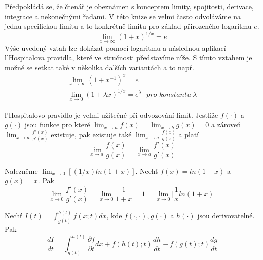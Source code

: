 Předpokládá se, že čtenář je obeznámen s konceptem limity, spojitosti, derivace, integrace a nekonečnými řadami. V této knize se velmi často odvoláváme na jednu specifickou limitu a to konkrétně limitu pro základ přirozeného logaritmu $e$.
\begin{equation*}
\lim_{x \rightarrow \infty}(1 + x)^{1/x} = e
\end{equation*}
Výše uvedený vztah lze dokázat pomocí logaritmu a následnou aplikací l'Hospitalova pravidla, které ve stručnosti představíme níže. S tímto vztahem je možné se setkat také v několika dalších variantách a to např.
\begin{gather*}
\lim_{x \rightarrow \infty}(1 + x^{-1})^x = e\\
\lim_{x \rightarrow 0}(1 + \lambda x)^{1/x} = e^{\lambda} ~~~\textit{pro konstantu}~ \lambda
\end{gather*}

\begin{definition}
l'Hospitalovo pravidlo je velmi užitečné při odvozování limit. Jestliže $f(\cdot)$ a $g(\cdot)$ jsou funkce pro které $\lim_{x \rightarrow a}f(x) = \lim_{x \rightarrow b}g(x) = 0$ a zároveň $\lim_{x \rightarrow a} \frac{f'(x)}{g'(x)}$ existuje, pak existuje také $\lim_{x \rightarrow a} \frac{f(x)}{g(x)}$ a platí
\begin{equation*}
\lim_{x \rightarrow a} \frac{f(x)}{g(x)} = \lim_{x \rightarrow a} \frac{f'(x)}{g'(x)}
\end{equation*}
\end{definition}

\begin{example}
Nalezněme $\lim_{x \rightarrow 0}[(1/x)ln(1 + x)]$.
Nechť $f(x) = ln(1 + x)$ a $g(x) = x$. Pak
\begin{equation*}
\lim_{x \rightarrow 0} \frac{f'(x)}{g'(x)} = \lim_{x \rightarrow 0} \frac{1}{1 + x} = 1 = \lim_{x \rightarrow 0}\Big[\frac{1}{x} ln(1 + x)\Big]
\end{equation*}
\end{example}

\begin{definition}
Nechť $I(t) = \int_{g(t)}^{h(t)}f(x;t)dx$, kde $f(\cdot,\cdot), g(\cdot)$ a $h(\cdot)$ jsou derivovatelné. Pak
\begin{equation*}
\frac{dI}{dt} = \int_{g(t)}^{h(t)}\frac{\partial f}{\partial t}dx + f(h(t);t) \frac{dh}{dt} - f(g(t);t) \frac{dg}{dt}
\end{equation*}
\end{definition}

